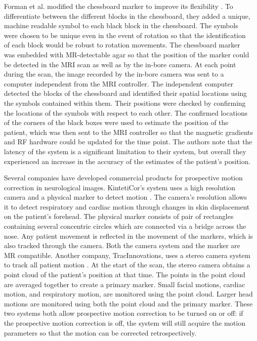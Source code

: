 Forman et al. modified the chessboard marker to improve its flexibility \cite{Forman2011}. To differentiate between the different blocks in the chessboard, they added a unique, machine readable symbol to each black block in the chessboard. The symbols were chosen to be unique even in the event of rotation so that the identification of each block would be robust to rotation movements. The chessboard marker was embedded with MR-detectable agar so that the position of the marker could be detected in the MRI scan as well as by the in-bore camera. At each point during the scan, the image recorded by the in-bore camera was sent to a computer independent from the MRI controller. The independent computer detected the blocks of the chessboard and identified their spatial locations using the symbols contained within them. Their positions were checked by confirming the locations of the symbols with respect to each other. The confirmed locations of the corners of the black boxes were used to estimate the position of the patient, which was then sent to the MRI controller so that the magnetic gradients and RF hardware could be updated for the time point. The authors note that the latency of the system is a significant limitation to their system, but overall they experienced an increase in the accuracy of the estimates of the patient's position.

Several companies have developed commercial products for prospective motion correction in neurological images. KintetiCor's system uses a high resolution camera and a physical marker to detect motion \cite{kineticor}. The camera's resolution allows it to detect respiratory and cardiac motion through changes in skin displacement on the patient's forehead. The physical marker consists of pair of rectangles containing several concentric circles which are connected via a bridge across the nose. Any patient movement is reflected in the movement of the markers, which is also tracked through the camera. Both the camera system and the marker are MR compatible. Another company, TracInnovations, uses a stereo camera system to track all patient motion \cite{tracinnovations}. At the start of the scan, the stereo camera obtains a point cloud of the patient's position at that time. The points in the point cloud are averaged together to create a primary marker. Small facial motions, cardiac motion, and respiratory motion, are monitored using the point cloud. Larger head motions are monitored using both the point cloud and the primary marker. These two systems both allow prospective motion correction to be turned on or off: if the prospective motion correction is off, the system will still acquire the motion parameters so that the motion can be corrected retrospectively.


